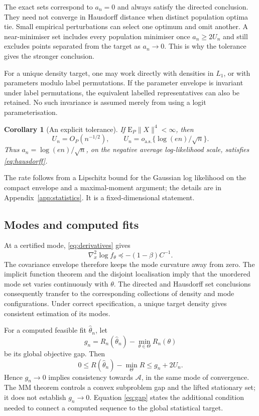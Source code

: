 \documentclass[12pt,a4paper]{article}
\newtheorem{corollary}[theorem]{Corollary}
\theoremstyle{remark}
\newcommand{\E}{\mathrm E}
\begin{document}
The exact sets correspond to $a_n=0$ and always satisfy the directed conclusion. They need not converge in Hausdorff distance when distinct population optima tie. Small empirical perturbations can select one optimum and omit another. A near-minimiser set includes every population minimiser once $a_n\ge2U_n$ and still excludes points separated from the target as $a_n\to0$. This is why the tolerance gives the stronger conclusion.

For a unique density target, one may work directly with densities in $L_1$, or with parameters modulo label permutations. If the parameter envelope is invariant under label permutations, the equivalent labelled representatives can also be retained. No such invariance is assumed merely from using a logit parameterisation.

\begin{corollary}[An explicit tolerance]\label{cor:tolerance}
If $\E_P\|X\|^4<\infty$, then
\[
 U_n=O_P(n^{-1/2}),\qquad
 U_n=o_{\mathrm{a.s.}}\{\log(en)/\sqrt n\}.
\]
Thus $a_n=\log(en)/\sqrt n$, on the negative average log-likelihood scale, satisfies \eqref{eq:hausdorff}.
\end{corollary}

The rate follows from a Lipschitz bound for the Gaussian log likelihood on the compact envelope and a maximal-moment argument; the details are in Appendix~\ref{app:statistics}. It is a fixed-dimensional statement.

\subsection{Modes and computed fits}

At a certified mode, \eqref{eq:derivatives} gives
\begin{equation}\label{eq:curvature}
 \nabla_x^2\log f_\theta
 \preceq-(1-\beta)C^{-1}.
\end{equation}
The covariance envelope therefore keeps the mode curvature away from zero. The implicit function theorem and the disjoint localisation imply that the unordered mode set varies continuously with $\theta$. The directed and Hausdorff set conclusions consequently transfer to the corresponding collections of density and mode configurations. Under correct specification, a unique target density gives consistent estimation of its modes.

For a computed feasible fit $\widehat\theta_n$, let
\[
 g_n=R_n(\widehat\theta_n)-\min_{\theta\in\Theta}R_n(\theta)
\]
be its global objective gap. Then
\begin{equation}\label{eq:gap}
 0\le R(\widehat\theta_n)-\min_\Theta R\le g_n+2U_n.
\end{equation}
Hence $g_n\to0$ implies consistency towards $\mathcal A$, in the same mode of convergence. The MM theorem controls a convex subproblem gap and the lifted stationary set; it does not establish $g_n\to0$. Equation \eqref{eq:gap} states the additional condition needed to connect a computed sequence to the global statistical target.
\end{document}
